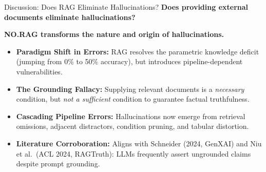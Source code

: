 \begin{frame}{Discussion: Does RAG Eliminate Hallucinations?}
  \vspace{0.1cm}
  {\Large\textbf{Does providing external documents eliminate hallucinations?}}
  \vspace{0.25cm}

  {\LARGE\textbf{\textcolor{alertred}{NO.}}\quad\normalsize\textbf{RAG transforms the nature and origin of hallucinations.}}
  \vspace{0.35cm}

  \pause
  \begin{itemize}
    \setlength{\itemsep}{0.22cm}
    \item \textbf{Paradigm Shift in Errors:} RAG resolves the parametric knowledge deficit (jumping from 0\% to 50\% accuracy), but introduces pipeline-dependent vulnerabilities.
    \item \textbf{The Grounding Fallacy:} Supplying relevant documents is a \emph{necessary} condition, but \emph{not a sufficient} condition to guarantee factual truthfulness.
  \end{itemize}

  \pause
  \vspace{0.1cm}
  \begin{itemize}
    \setlength{\itemsep}{0.22cm}
    \item \textbf{Cascading Pipeline Errors:} Hallucinations now emerge from retrieval omissions, adjacent distractors, condition pruning, and tabular distortion.
    \item \textbf{Literature Corroboration:} Aligns with Schneider (2024, GenXAI) and Niu et al.\ (ACL 2024, RAGTruth): LLMs frequently assert ungrounded claims despite prompt grounding.
  \end{itemize}

\end{frame}
